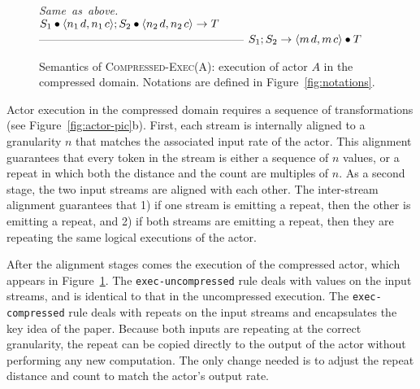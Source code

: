 \begin{figure}[t]
\hfill\mbox{\it Same as above.}\vspace{6pt}\\
$S_1 \bullet \langle n_1{\hspace{1.3pt}}d, n_1{\hspace{1.3pt}}c\rangle;S_2 \bullet \langle n_2{\hspace{1.3pt}}d, n_2{\hspace{1.3pt}}c\rangle \rightarrow T$ \skiptopb
------------------------------------------------------ \skipbot
$S_1; S_2 \rightarrow \langle m{\hspace{1.3pt}}d, m{\hspace{1.3pt}}c\rangle \bullet T$
\caption{Semantics of \textsc{Compressed-Exec(A)}: execution of actor
$A$ in the compressed domain.
Notations are defined in Figure~\ref{fig:notations}.
\protect\label{fig:compressed-exec-rule}}
\end{figure}

Actor execution in the compressed domain requires a sequence of
transformations (see Figure~\ref{fig:actor-pic}b).  First, each stream
is internally aligned to a granularity $n$ that matches the associated
input rate of the actor.  This alignment guarantees that every token
in the stream is either a sequence of $n$ values, or a repeat in which
both the distance and the count are multiples of $n$.  As a second
stage, the two input streams are aligned with each other.  The
inter-stream alignment guarantees that 1) if one stream is emitting a
repeat, then the other is emitting a repeat, and 2) if both streams
are emitting a repeat, then they are repeating the same logical
executions of the actor.

After the alignment stages comes the execution of the compressed
actor, which appears in Figure~\ref{fig:compressed-exec-rule}.  The
{\tt exec-uncompressed} rule
deals with values on the input streams, and is identical to that in
the uncompressed execution.  The {\tt exec-compressed} rule deals with
repeats on the input streams and encapsulates the key idea of the
paper.  Because both inputs are repeating at the correct granularity,
the repeat can be copied directly to the output of the actor without
performing any new computation.  The only change needed is to adjust
the repeat distance and count to match the actor's output rate.

